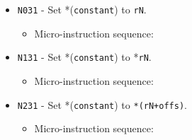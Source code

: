 \documentclass{article}
\def\pkptrout{\Verb|0202| - output *\Verb|pk| to data bus}
\def\tmpatoaddr{\Verb|2102| - output \Verb|tmpA| to addr bus}
\def\datatotmpa{\Verb|2402| - write to \Verb|tmpA| from data bus}
\def\incrementpk{\Verb|0502| - increment \Verb|pk|}
\def\regtodata#1{\Verb|#1003| - output \Verb|r#1| to data bus}
\def\regptodata#1{\Verb|#1203| - output *\Verb|r#1| to data bus}
\def\writeRAM{\Verb|0004| - write data bus to *(addr bus)}
\def\echodataaddr{\Verb|0021| - echo data bus to addr bus for 3 cycles}
\def\echodatalong{\Verb|0025| - echo data bus to itself for 3 cycles}
\def\done{\Verb|fffe| - end instruction}
\begin{document}
\begin{itemize}
    \item \Verb|N031| - Set *(\Verb|constant|) to \Verb|rN|.
    \begin{itemize}
        \item Micro-instruction sequence:
    \end{itemize}

    \item \Verb|N131| - Set *(\Verb|constant|) to *\Verb|rN|.
    \begin{itemize}
        \item Micro-instruction sequence:
    \end{itemize}
    
    \item \Verb|N231| - Set *(\Verb|constant|) to \Verb|*(rN+offs)|.
    \begin{itemize}
        \item Micro-instruction sequence:
    \end{itemize}
    

\end{itemize}
\end{document}
